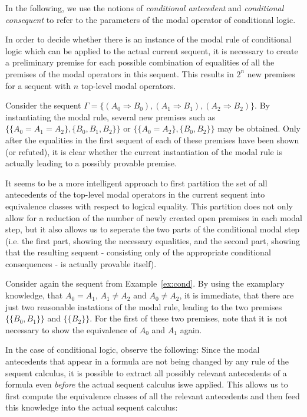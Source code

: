 \documentclass{entcs} \usepackage{entcsmacro}
\begin{document}
In the following, we use the notions of \emph{conditional antecedent} and
\emph{conditional consequent} to refer to the parameters of the modal operator of
conditional logic. 

In order to decide whether there is an
instance of the modal rule of conditional logic which can be applied to
the actual current sequent, it is necessary to create a preliminary premise
for each possible combination of equalities of all the premises of the
modal operators in this sequent. This results in $2^n$ new premises for
a sequent with $n$ top-level modal operators.

\begin{example}
Consider the sequent $\Gamma=\{(A_0\Rightarrow B_0),(A_1\Rightarrow B_1),
(A_2\Rightarrow B_2)\}$. By instantiating the modal rule, several
new premises
such as $\{\{A_0=A_1=A_2\},\{B_0,B_1,B_2\}\}$ or $\{\{A_0=A_2\},\{B_0,B_2\}\}$
may be obtained. Only after the equalities in the first sequent of each
of these premises have been shown (or refuted), it is clear whether the
current instantiation of the modal rule is actually leading to a possibly
provable premise.
\label{ex:cond}
\end{example}

It seems to be a more intelligent approach to first
partition the set of all antecedents of the top-level modal operators in the
current sequent into equivalence classes with respect to logical equality.
This partition does not only allow for a reduction of the number of newly
created open premises in each modal step,
but it also allows us to seperate the two parts of the conditional modal step
(i.e. the first part, showing the necessary equalities, and the second
part, showing that the resulting sequent - consisting only of the appropriate
conditional consequences - is actually provable itself).

\begin{example}
Consider again the sequent from Example~\ref{ex:cond}. By using the examplary
knowledge, that $A_0=A_1$, $A_1\neq A_2$ and $A_0\neq A_2$, it is immediate,
that there are just two reasonable instations of the modal rule, leading
to the two premises $\{\{B_0,B_1\}\}$ and $\{\{B_2\}\}$. For the
first of these two premises, note that it is not necessary to show the
equivalence of $A_0$ and $A_1$ again.
\end{example}


\begin{remark}
In the case of conditional logic, observe the following: Since the
modal antecedents that appear in a formula are not being changed by any
rule of the sequent calculus, it is possible to extract all possibly
relevant antecedents of a formula even \emph{before} the actual sequent
calculus iswe applied. This allows us to first compute the equivalence
classes of all the relevant antecedents and then feed this knowledge into
the actual sequent calculus:
\end{remark}
\end{document}
